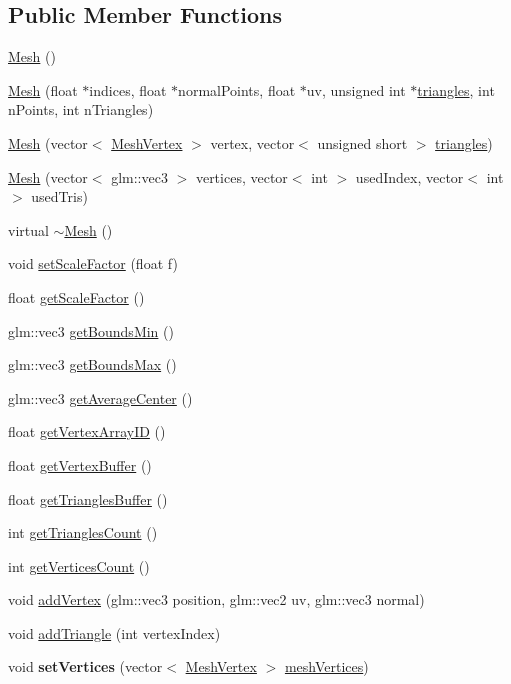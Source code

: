 \subsection*{Public Member Functions}
\begin{DoxyCompactItemize}
\item 
\hyperlink{class_mesh_a2af137f1571af89172b9c102302c416b}{Mesh} ()
\item 
\hyperlink{class_mesh_a6001afbb24255fe880ae5d609bfb7cd2}{Mesh} (float $\ast$indices, float $\ast$normal\+Points, float $\ast$uv, unsigned int $\ast$\hyperlink{class_mesh_ad41061e78a04735d509e548141d43a49}{triangles}, int n\+Points, int n\+Triangles)
\item 
\hyperlink{class_mesh_a8d847ce8604fd8f6e84f97acbf481503}{Mesh} (vector$<$ \hyperlink{struct_mesh_vertex}{Mesh\+Vertex} $>$ vertex, vector$<$ unsigned short $>$ \hyperlink{class_mesh_ad41061e78a04735d509e548141d43a49}{triangles})
\item 
\hyperlink{class_mesh_a6cc43f6b68cf3fd6881f17ba78ab089d}{Mesh} (vector$<$ glm\+::vec3 $>$ vertices, vector$<$ int $>$ used\+Index, vector$<$ int $>$ used\+Tris)
\item 
virtual \hyperlink{class_mesh_a5efe4da1a4c0971cfb037bd70304c303}{$\sim$\+Mesh} ()
\item 
void \hyperlink{class_mesh_a97cadeaf5ef95c8a35d5eb2ded9ca73c}{set\+Scale\+Factor} (float f)
\item 
float \hyperlink{class_mesh_a4d70792ba5142b0d663d39443917da58}{get\+Scale\+Factor} ()
\item 
glm\+::vec3 \hyperlink{class_mesh_a563db5002a111f742d2939f4a432d4ef}{get\+Bounds\+Min} ()
\item 
glm\+::vec3 \hyperlink{class_mesh_a47a810bcf709c90d36e453af2bbe11c0}{get\+Bounds\+Max} ()
\item 
glm\+::vec3 \hyperlink{class_mesh_aa93bf2f2ae299b9987d083e8549c4d20}{get\+Average\+Center} ()
\item 
float \hyperlink{class_mesh_a891595d8aa7ca667df30d03d14dae0f3}{get\+Vertex\+Array\+I\+D} ()
\item 
float \hyperlink{class_mesh_a170e6001bf96cc741afe7d9425b2f440}{get\+Vertex\+Buffer} ()
\item 
float \hyperlink{class_mesh_a111b94c34d164c15dbe391940e0202c1}{get\+Triangles\+Buffer} ()
\item 
int \hyperlink{class_mesh_ae3957c15ba7d62336640b822d2c41161}{get\+Triangles\+Count} ()
\item 
int \hyperlink{class_mesh_a1394a088d7e4bb7a82ca1799098fe025}{get\+Vertices\+Count} ()
\item 
void \hyperlink{class_mesh_a571745a25511f03dfb54bb9248ebe0e9}{add\+Vertex} (glm\+::vec3 position, glm\+::vec2 uv, glm\+::vec3 normal)
\item 
void \hyperlink{class_mesh_a317d2916ce9675ef1b4d1b70f9ef62a6}{add\+Triangle} (int vertex\+Index)
\item 
\hypertarget{class_mesh_a57dd31edc88c118fddc8d60c4fe08efd}{}void {\bfseries set\+Vertices} (vector$<$ \hyperlink{struct_mesh_vertex}{Mesh\+Vertex} $>$ \hyperlink{class_mesh_a91899b71cdc960ef485b07ffcd0c0cd6}{mesh\+Vertices})\label{class_mesh_a57dd31edc88c118fddc8d60c4fe08efd}


\end{DoxyCompactItemize}
